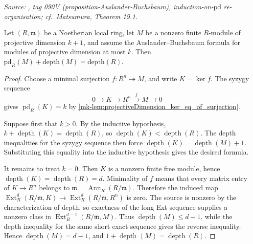 \begin{lemma}[Auslander--Buchsbaum: inductive step \(\text{pd} = k+1\)]\label{mk-lem:auslander_buchsbaum_formula_succ_pd}
  \leanok

  \textit{Source: \cite{stacks-project}, tag 090V (proposition-Auslander-Buchsbaum),
  induction-on-\(\text{pd}\) re-organisation; cf.\ Matsumura, Theorem 19.1.}

  Let \((R,\mathfrak m)\) be a Noetherian local ring, let \(M\) be a
  nonzero finite \(R\)-module of projective dimension \(k+1\), and assume
  the Auslander--Buchsbaum formula for modules of projective dimension at
  most \(k\). Then
  \(\text{pd}_R(M) + \text{depth}(M) = \text{depth}(R)\).
\end{lemma}
\begin{proof}
  \leanok
  Choose a minimal surjection \(f:R^n\twoheadrightarrow M\), and write
  \(K=\ker f\). The syzygy sequence
  \[
    0\longrightarrow K\longrightarrow R^n\xrightarrow{f}M\longrightarrow 0
  \]
  gives \(\operatorname{pd}_R(K)=k\) by
  \ref{mk-lem:projectiveDimension_ker_eq_of_surjection}.

  Suppose first that \(k>0\). By the inductive hypothesis,
  \(k+\operatorname{depth}(K)=\operatorname{depth}(R)\), so
  \(\operatorname{depth}(K)<\operatorname{depth}(R)\). The depth
  inequalities for the syzygy sequence then force
  \(\operatorname{depth}(K)=\operatorname{depth}(M)+1\). Substituting
  this equality into the inductive hypothesis gives the desired formula.

  It remains to treat \(k=0\). Then \(K\) is a nonzero finite free
  module, hence \(\operatorname{depth}(K)=\operatorname{depth}(R)=d\).
  Minimality of \(f\) means that every matrix entry of
  \(K\to R^n\) belongs to \(\mathfrak m=\operatorname{Ann}_R(R/\mathfrak m)\).
  Therefore the induced map
  \(\operatorname{Ext}^d_R(R/\mathfrak m,K)\to
  \operatorname{Ext}^d_R(R/\mathfrak m,R^n)\) is zero. The source is
  nonzero by the characterization of depth, so exactness of the long
  Ext sequence supplies a nonzero class in
  \(\operatorname{Ext}^{d-1}_R(R/\mathfrak m,M)\). Thus
  \(\operatorname{depth}(M)\leq d-1\), while the depth inequality for
  the same short exact sequence gives the reverse inequality. Hence
  \(\operatorname{depth}(M)=d-1\), and
  \(1+\operatorname{depth}(M)=\operatorname{depth}(R)\).
\end{proof}

